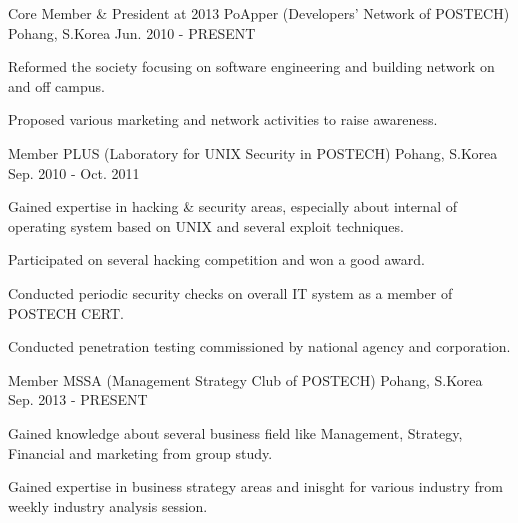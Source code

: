 
\begin{cventries}

  \cventry
  {Core Member \& President at 2013} %
  {PoApper (Developers' Network of POSTECH)} %
  {Pohang, S.Korea} %
  {Jun. 2010 - PRESENT} %
  {
    \begin{cvitems} %
    \item {Reformed the society focusing on software engineering and building network on and off campus.}
    \item {Proposed various marketing and network activities to raise awareness.}
    \end{cvitems}
  }

  \cventry
  {Member} %
  {PLUS (Laboratory for UNIX Security in POSTECH)} %
  {Pohang, S.Korea} %
  {Sep. 2010 - Oct. 2011} %
  {
    \begin{cvitems} %
    \item {Gained expertise in hacking \& security areas, especially about internal of operating system based on UNIX and several exploit techniques.}
    \item {Participated on several hacking competition and won a good award.}
    \item {Conducted periodic security checks on overall IT system as a member of POSTECH CERT.}
    \item {Conducted penetration testing commissioned by national agency and corporation.}
    \end{cvitems}
  }

  \cventry
  {Member} %
  {MSSA (Management Strategy Club of POSTECH)} %
  {Pohang, S.Korea} %
  {Sep. 2013 - PRESENT} %
  {
    \begin{cvitems} %
    \item {Gained knowledge about several business field like Management, Strategy, Financial and marketing from group study.}
    \item {Gained expertise in business strategy areas and inisght for various industry from weekly industry analysis session.}
    \end{cvitems}
  }

\end{cventries}
